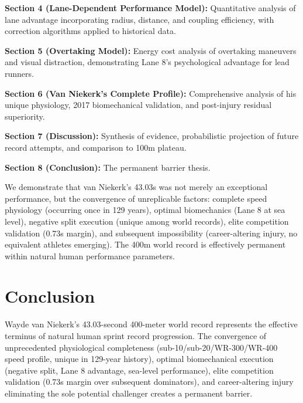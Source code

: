 \documentclass[twocolumn,10pt]{article}
\begin{document}
\textbf{Section 4 (Lane-Dependent Performance Model):} Quantitative analysis of lane advantage incorporating radius, distance, and coupling efficiency, with correction algorithms applied to historical data.

\textbf{Section 5 (Overtaking Model):} Energy cost analysis of overtaking maneuvers and visual distraction, demonstrating Lane 8's psychological advantage for lead runners.

\textbf{Section 6 (Van Niekerk's Complete Profile):} Comprehensive analysis of his unique physiology, 2017 biomechanical validation, and post-injury residual superiority.

\textbf{Section 7 (Discussion):} Synthesis of evidence, probabilistic projection of future record attempts, and comparison to 100m plateau.

\textbf{Section 8 (Conclusion):} The permanent barrier thesis.

We demonstrate that van Niekerk's 43.03s was not merely an exceptional performance, but the convergence of unreplicable factors: complete speed physiology (occurring once in 129 years), optimal biomechanics (Lane 8 at sea level), negative split execution (unique among world records), elite competition validation (0.73s margin), and subsequent impossibility (career-altering injury, no equivalent athletes emerging). The 400m world record is effectively permanent within natural human performance parameters.








\section{Conclusion}

Wayde van Niekerk's 43.03-second 400-meter world record represents the effective terminus of natural human sprint record progression. The convergence of unprecedented physiological completeness (sub-10/sub-20/WR-300/WR-400 speed profile, unique in 129-year history), optimal biomechanical execution (negative split, Lane 8 advantage, sea-level performance), elite competition validation (0.73s margin over subsequent dominators), and career-altering injury eliminating the sole potential challenger creates a permanent barrier.
\end{document}
